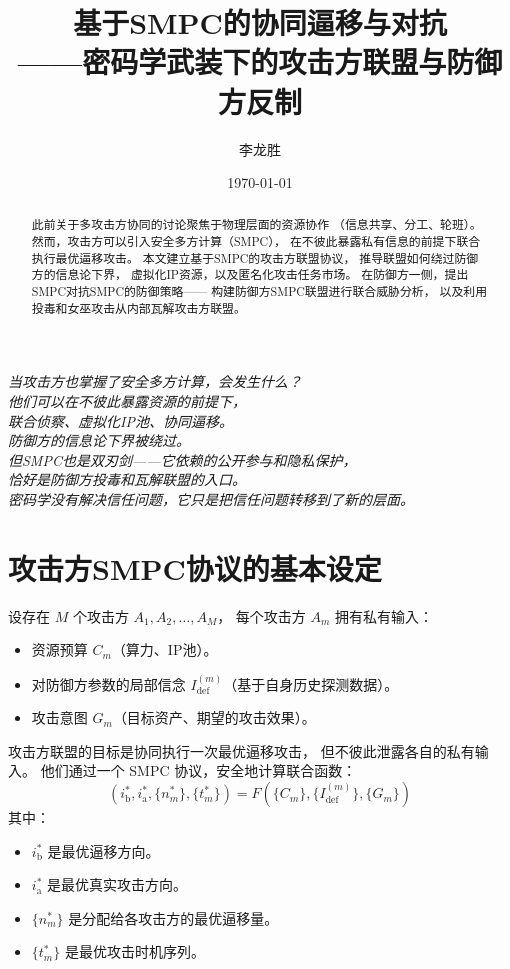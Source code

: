 \documentclass[11pt,a4paper]{article}
\title{基于SMPC的协同逼移与对抗\\
——密码学武装下的攻击方联盟与防御方反制}
\author{李龙胜}
\date{\today}
\begin{document}
\maketitle

\begin{center}
\textit{
当攻击方也掌握了安全多方计算，会发生什么？\\
他们可以在不彼此暴露资源的前提下，\\
联合侦察、虚拟化IP池、协同逼移。\\
防御方的信息论下界被绕过。\\
但SMPC也是双刃剑——它依赖的公开参与和隐私保护，\\
恰好是防御方投毒和瓦解联盟的入口。\\
密码学没有解决信任问题，它只是把信任问题转移到了新的层面。
}
\end{center}

\vspace{5mm}

\begin{abstract}
此前关于多攻击方协同的讨论聚焦于物理层面的资源协作
（信息共享、分工、轮班）。
然而，攻击方可以引入安全多方计算（SMPC），
在不彼此暴露私有信息的前提下联合执行最优逼移攻击。
本文建立基于SMPC的攻击方联盟协议，
推导联盟如何绕过防御方的信息论下界，
虚拟化IP资源，以及匿名化攻击任务市场。
在防御方一侧，提出SMPC对抗SMPC的防御策略——
构建防御方SMPC联盟进行联合威胁分析，
以及利用投毒和女巫攻击从内部瓦解攻击方联盟。
\end{abstract}

\tableofcontents

\section{攻击方SMPC协议的基本设定}

设存在 \(M\) 个攻击方 \(A_1, A_2, \dots, A_M\)，
每个攻击方 \(A_m\) 拥有私有输入：
\begin{itemize}
    \item 资源预算 \(C_m\)（算力、IP池）。
    \item 对防御方参数的局部信念 \(I_{\text{def}}^{(m)}\)（基于自身历史探测数据）。
    \item 攻击意图 \(G_m\)（目标资产、期望的攻击效果）。
\end{itemize}

攻击方联盟的目标是协同执行一次最优逼移攻击，
但不彼此泄露各自的私有输入。
他们通过一个 SMPC 协议，安全地计算联合函数：
\[
(i_{\text{b}}^*, i_{\text{a}}^*, \{n_m^*\}, \{t_m^*\}) = F(\{C_m\}, \{I_{\text{def}}^{(m)}\}, \{G_m\})
\]
其中：
\begin{itemize}
    \item \(i_{\text{b}}^*\) 是最优逼移方向。
    \item \(i_{\text{a}}^*\) 是最优真实攻击方向。
    \item \(\{n_m^*\}\) 是分配给各攻击方的最优逼移量。
    \item \(\{t_m^*\}\) 是最优攻击时机序列。
\end{itemize}
\end{document}
